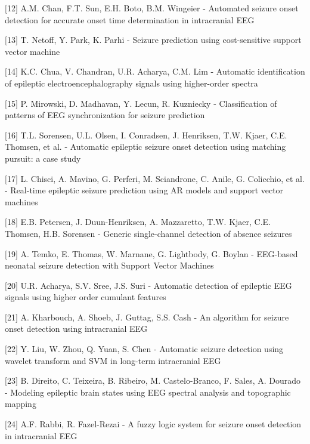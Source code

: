 \documentclass{llncs}       %
\begin{document}
\begin{thebibliography}{}
$[$12$]$ A.M. Chan, F.T. Sun, E.H. Boto, B.M. Wingeier - Automated 
seizure onset detection for accurate onset time determination in 
intracranial EEG

$[$13$]$ T. Netoff, Y. Park, K. Parhi - Seizure prediction using 
cost-sensitive support vector machine

$[$14$]$ K.C. Chua, V. Chandran, U.R. Acharya, C.M. Lim - Automatic 
identification of epileptic electroencephalography signals using 
higher-order spectra

$[$15$]$ P. Mirowski, D. Madhavan, Y. Lecun, R. Kuzniecky - 
Classification of patterns of EEG synchronization for seizure prediction

$[$16$]$ T.L. Sorensen, U.L. Olsen, I. Conradsen, J. Henriksen, T.W. 
Kjaer, C.E. Thomsen, et al. - Automatic epileptic seizure onset 
detection using matching pursuit: a case study

$[$17$]$ L. Chisci, A. Mavino, G. Perferi, M. Sciandrone, C. Anile, G. 
Colicchio, et al. - Real-time epileptic seizure prediction using AR 
models and support vector machines

$[$18$]$ E.B. Petersen, J. Duun-Henriksen, A. Mazzaretto, T.W. Kjaer, 
C.E. Thomsen, H.B. Sorensen - Generic single-channel detection of 
absence seizures

$[$19$]$ A. Temko, E. Thomas, W. Marnane, G. Lightbody, G. Boylan - 
EEG-based neonatal seizure detection with Support Vector Machines

$[$20$]$ U.R. Acharya, S.V. Sree, J.S. Suri - Automatic detection of 
epileptic EEG signals using higher order cumulant features

$[$21$]$ A. Kharbouch, A. Shoeb, J. Guttag, S.S. Cash - An algorithm for 
seizure onset detection using intracranial EEG

$[$22$]$ Y. Liu, W. Zhou, Q. Yuan, S. Chen - Automatic seizure detection 
using wavelet transform and SVM in long-term intracranial EEG

$[$23$]$ B. Direito, C. Teixeira, B. Ribeiro, M. Castelo-Branco, F. 
Sales, A. Dourado - Modeling epileptic brain states using EEG spectral 
analysis and topographic mapping

$[$24$]$ A.F. Rabbi, R. Fazel-Rezai - A fuzzy logic system for seizure 
onset detection in intracranial EEG






\end{thebibliography}
\end{document}

